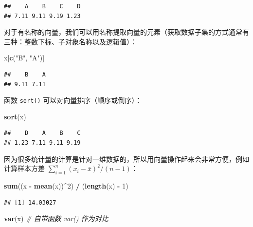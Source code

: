 \documentclass[
  b5paper,
  UTF8,twoside]{book}
\newenvironment{Shaded}{\begin{snugshade}}{\end{snugshade}}
\newcommand{\CommentTok}[1]{\textcolor[rgb]{0.56,0.35,0.01}{\textit{#1}}}
\newcommand{\DecValTok}[1]{\textcolor[rgb]{0.00,0.00,0.81}{#1}}
\newcommand{\FunctionTok}[1]{\textcolor[rgb]{0.13,0.29,0.53}{\textbf{#1}}}
\newcommand{\NormalTok}[1]{#1}
\newcommand{\SpecialCharTok}[1]{\textcolor[rgb]{0.81,0.36,0.00}{\textbf{#1}}}
\newcommand{\StringTok}[1]{\textcolor[rgb]{0.31,0.60,0.02}{#1}}
\begin{document}
\begin{verbatim}
##    A    B    C    D 
## 7.11 9.11 9.19 1.23
\end{verbatim}

对于有名称的向量，我们可以用名称提取向量的元素（获取数据子集的方式通常有三种：整数下标、子对象名称以及逻辑值）：

\begin{Shaded}
\begin{Highlighting}[]
\NormalTok{x[}\FunctionTok{c}\NormalTok{(}\StringTok{"B"}\NormalTok{, }\StringTok{"A"}\NormalTok{)]}
\end{Highlighting}
\end{Shaded}

\begin{verbatim}
##    B    A 
## 9.11 7.11
\end{verbatim}

函数 \texttt{sort()} 可以对向量排序（顺序或倒序）：

\begin{Shaded}
\begin{Highlighting}[]
\FunctionTok{sort}\NormalTok{(x)}
\end{Highlighting}
\end{Shaded}

\begin{verbatim}
##    D    A    B    C 
## 1.23 7.11 9.11 9.19
\end{verbatim}

因为很多统计量的计算是针对一维数据的，所以用向量操作起来会非常方便，例如计算样本方差 \(\sum_{i=1}^{n}(x_{i}-\bar{x})^{2}/(n-1)\)：

\begin{Shaded}
\begin{Highlighting}[]
\FunctionTok{sum}\NormalTok{((x }\SpecialCharTok{{-}} \FunctionTok{mean}\NormalTok{(x))}\SpecialCharTok{\^{}}\DecValTok{2}\NormalTok{) }\SpecialCharTok{/}\NormalTok{ (}\FunctionTok{length}\NormalTok{(x) }\SpecialCharTok{{-}} \DecValTok{1}\NormalTok{)}
\end{Highlighting}
\end{Shaded}

\begin{verbatim}
## [1] 14.03027
\end{verbatim}

\begin{Shaded}
\begin{Highlighting}[]
\FunctionTok{var}\NormalTok{(x) }\CommentTok{\# 自带函数 var() 作为对比}
\end{Highlighting}
\end{Shaded}
\end{document}
